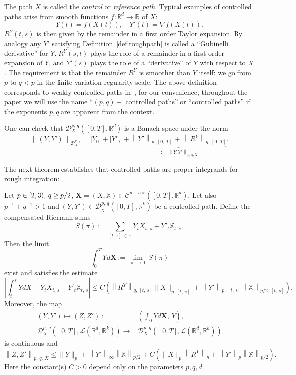 \documentclass[AHL,Unicode,longabstracts,published]{cedram}
\newcommand{\bfX}{\mathbf{X}}
\newcommand{\scrD}{\mathscr{D}}
\newcommand{\bbX}{\mathbb{X}}
\newcommand{\calD}{\mathcal{D}}
\newcommand{\calL}{\mathcal{L}}
\newcommand{\calC}{\mathcal{C}}
\newcommand{\Rr}{{\mathbb{R}}}
\begin{document}
The path $X$ is called the \emph{control} or \emph{reference path}. Typical examples of controlled paths arise from smooth functions $f: \Rr^d\to \Rr$ of $X$:
\[
Y(t)=f(X(t)),\quad Y'(t)=\nabla f(X(t)).
\]
$R^Y(t,s)$ is then given by the remainder in a first order Taylor expansion. By analogy any $Y'$ satisfying Definition~\ref{def.roughpath} is called a ``Gubinelli derivative'' for $Y$. $R^{Y}(s,t)$ plays the role of a remainder in a first order expansion of $Y$, and $Y'(s)$ plays the role of a ``derivative'' of $Y$ with respect to $X$. The requirement is that the remainder $R^{Y}$ is smoother than $Y$ itself: we go from $p$ to $q<p$ in the finite variation regularity scale. The above definition corresponds to weakly-controlled paths in~\cite{gubinelli2004}, for our convenience, throughout the paper we will use the name ``$(p, q)-$ controlled paths'' or ``controlled paths'' if the exponents $p, q$ are apparent from the context.

One can check that $\scrD^{p,\,q}_{X}([0,T],\Rr^d)$ is a Banach space under the norm
\[
\left\|\left(Y,Y'\right)\right\|_{\scrD^{p,\,q}_{X}}= \left|Y_0\right|+\left|Y'_0\right|+ \underbrace{\left\|Y'\right\|_{p,\,[0,\,T]}\,+\,\left\|R^Y\right\|_{q,\,[0,\,T]}}_{:=\,\left\|Y,Y'\right\|_{p,\,q,X}}.
\]



The next theorem establishes that controlled paths are proper integrands for rough integration:
\begin{theo}\label{chp02theorem:itegralcontrol}
Let $p\linebreak\in [2, 3),\, q\geq p/2$, $\bfX=(X,\bbX)\in\calC^{p-var}([0,T], \Rr^d)$. Let also $p^{-1}+q^{-1}>1$ and $(Y,Y')\in\calD^{p,\,q}_{_X}([0,T], \Rr^k)$ be a controlled path. Define the compensated Riemann sums
\[
S (\pi):=\sum_{[t,\,s]\,\in\,\pi} Y_{t}X_{t,\,s}+ Y'_{t}\bbX_{t,\,s}.
\]
Then the limit
\[
\int_0^T Y d\bfX:= \lim_{|\pi|\,\to\,0} S (\pi)
\]
exist and satisfies the estimate
\[
\left|\int_t^s Y dX-Y_{t}X_{t,\,s}- Y'_{t}{\bbX}_{t,\,s}\right|
\leq C\left(\left\|{R}^Y\right\|_{q,\,[t,\,s]}\|X\|_{p,\,[t,\,s]}+\left\|Y'\right\|_{p,\,[t,\,s]}\left\|\bbX\right\|_{p/2,\,[t,\,s]}\right).
\]
Moreover, the map
\begin{align*}
\left(Y,Y'\right)\mapsto \left(Z,Z'\right):=& \left(\int_0^{\cdot}Yd\bfX,\, Y\right),
\\
\scrD^{p,\,q}_{X}\left([0,T],\calL\left(\Rr^d,\Rr^k\right)\right)\rightarrow& \scrD^{p,\,q}_{X}\left([0,T],\calL\left(\Rr^d,\Rr^k\right)\right)
\end{align*}
is continuous and
\[
\left\|Z,Z'\right\|_{p,\,q,\,X}\leq \|Y\|_{p}+\left\|Y'\right\|_{\infty}\left\|\bbX\right\|_{p/2} +C\left(\|X\|_{p}\left\|R^{Y}\right\|_{q}+\left\|Y'\right\|_{p}\left\|\bbX\right\|_{p/2}\right).
\]
Here the constant(s) $C>0$ depend only on the parameters $p, q, d.$
\end{theo}
\end{document}
